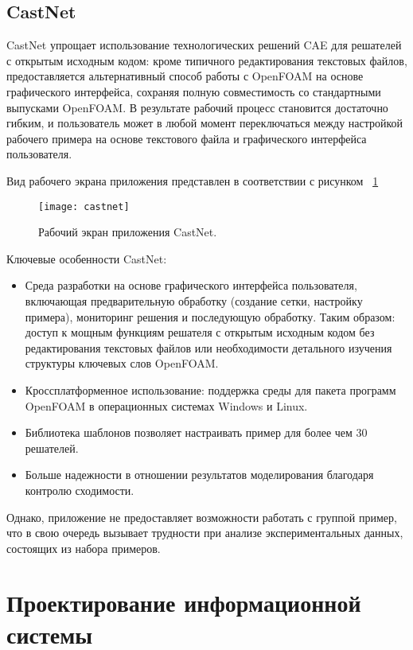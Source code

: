 \documentclass[14pt]{extreport}
\begin{document}
\section{CastNet}

CastNet упрощает использование технологических решений CAE для решателей с открытым исходным кодом: кроме типичного редактирования текстовых файлов, предоставляется альтернативный способ работы с OpenFOAM на основе графического интерфейса, сохраняя полную совместимость со стандартными выпусками OpenFOAM. В результате рабочий процесс становится достаточно гибким, и пользователь может в любой момент переключаться между настройкой рабочего примера на основе текстового файла и графического интерфейса пользователя.

Вид рабочего экрана приложения представлен в соответствии с рисунком ~\ref{fig4}
\begin{figure}[H]
\centerline{\texttt{[image: castnet]}}
\caption{Рабочий экран приложения CastNet.}
\label{fig4}
\end{figure}

Ключевые особенности CastNet:
\begin{itemize}
\item Среда разработки на основе графического интерфейса пользователя, включающая предварительную обработку (создание сетки, настройку примера), мониторинг решения и последующую обработку. Таким образом: доступ к мощным функциям решателя с открытым исходным кодом без редактирования текстовых файлов или необходимости детального изучения структуры ключевых слов OpenFOAM.
\item Кроссплатформенное использование: поддержка среды для пакета программ OpenFOAM в операционных системах Windows и Linux.
\item Библиотека шаблонов позволяет настраивать пример для более чем 30 решателей.
\item Больше надежности в отношении результатов моделирования благодаря контролю сходимости.
\end{itemize}

Однако, приложение не предоставляет возможности работать с группой пример, что в свою очередь вызывает трудности при анализе экспериментальных данных, состоящих из набора примеров. 

\chapter{Проектирование информационной системы}
\end{document}
